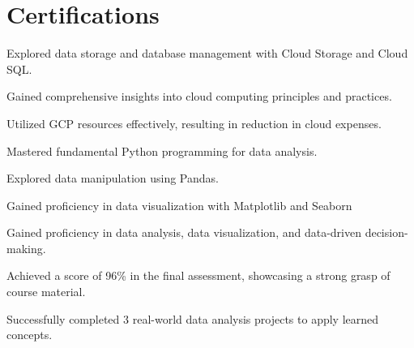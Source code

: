 \documentclass[]{deedy-resume-openfont}
\begin{document}
\hfill
\begin{minipage}[t]{0.66\textwidth} 


\section{Certifications}
\vspace{\topsep} %
\begin{tightemize}
\item Explored data storage and database management with Cloud Storage and Cloud SQL.
\item Gained comprehensive insights into cloud computing principles and practices. 
\item Utilized GCP resources effectively, resulting in reduction in cloud expenses.
\end{tightemize}
\sectionsep

\vspace{\topsep} %
\begin{tightemize}
\item Mastered fundamental Python programming for data analysis.
\item Explored data manipulation using Pandas.
\item Gained proficiency in data visualization with Matplotlib and Seaborn
\end{tightemize}
\sectionsep

\begin{tightemize}
\item Gained proficiency in data analysis, data visualization, and data-driven decision-making.
\item Achieved a score of 96\% in the final assessment, showcasing a strong grasp of course material.
\item Successfully completed 3 real-world data analysis projects to apply learned concepts.
\end{tightemize}
\sectionsep



\end{minipage}
\end{document}
